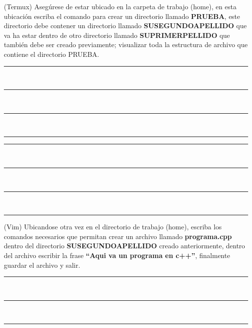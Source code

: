 \documentclass[12pt]{exam}
\begin{document}
\begin{questions}
\question[20] (Termux) Asegúrese de estar ubicado en la carpeta de trabajo (home), en esta ubicación escriba el comando  para crear un directorio llamado \textbf{PRUEBA}, este directorio  debe contener un directorio llamado \textbf{SUSEGUNDOAPELLIDO} que va ha estar dentro de otro directorio llamado \textbf{SUPRIMERPELLIDO} que también debe ser creado previamente; visualizar toda la estructura de archivo que contiene el directorio PRUEBA.\\


\begin{minipage}[H]{0.40\linewidth}
  \noindent \rule{7cm}{0.4pt} \\
  
  \noindent \rule{7cm}{0.4pt} \\
  
  \noindent \rule{7cm}{0.4pt} \\
  
  \noindent \rule{7cm}{0.4pt} 
  
\end{minipage} \hspace{2cm} 
\begin{minipage}[H]{0.40\linewidth}
    \noindent \rule{7cm}{0.4pt} \\
  
    \noindent \rule{7cm}{0.4pt} \\
  
    \noindent \rule{7cm}{0.4pt} \\
  
    \noindent \rule{7cm}{0.4pt} 
  
\end{minipage}

\question[20] (Vim) Ubicandose otra vez en el directorio de trabajo (home), escriba los comandos necesarios que permitan crear un archivo
llamado \textbf{programa.cpp} dentro del directorio
\textbf{SUSEGUNDOAPELLIDO} creado anteriormente, dentro del
archivo escribir la frase \textbf{``Aqui va un programa en c++''}, finalmente guardar el archivo y salir.\\

\begin{minipage}[H]{0.40\linewidth}
  \noindent \rule{7cm}{0.4pt} \\
  
  \noindent \rule{7cm}{0.4pt} \\
  
  \noindent \rule{7cm}{0.4pt} \\
  

\end{minipage}
\end{questions}
\end{document}
